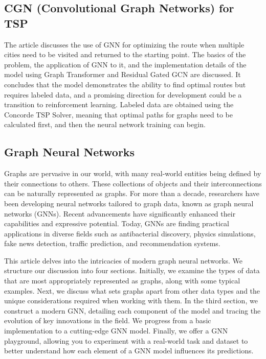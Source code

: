 \subsection{CGN (Convolutional Graph Networks) for TSP}
The article \cite{gnn} discusses the use of GNN for optimizing the route when multiple cities need to be visited and returned to the starting point. The basics of the problem, the application of GNN to it, and the implementation details of the model using Graph Transformer and Residual Gated GCN are discussed. It concludes that the model demonstrates the ability to find optimal routes but requires labeled data, and a promising direction for development could be a transition to reinforcement learning. Labeled data are obtained using the Concorde TSP Solver, meaning that optimal paths for graphs need to be calculated first, and then the neural network training can begin.

\subsection{Graph Neural Networks}
Graphs are pervasive in our world, with many real-world entities being defined by their connections to others. These collections of objects and their interconnections can be naturally represented as graphs. For more than a decade, researchers have been developing neural networks tailored to graph data, known as graph neural networks (GNNs). Recent advancements have significantly enhanced their capabilities and expressive potential. Today, GNNs are finding practical applications in diverse fields such as antibacterial discovery, physics simulations, fake news detection, traffic prediction, and recommendation systems.

This article \cite{sanchez-lengeling2021a} delves into the intricacies of modern graph neural networks. We structure our discussion into four sections. Initially, we examine the types of data that are most appropriately represented as graphs, along with some typical examples. Next, we discuss what sets graphs apart from other data types and the unique considerations required when working with them. In the third section, we construct a modern GNN, detailing each component of the model and tracing the evolution of key innovations in the field. We progress from a basic implementation to a cutting-edge GNN model. Finally, we offer a GNN playground, allowing you to experiment with a real-world task and dataset to better understand how each element of a GNN model influences its predictions.

